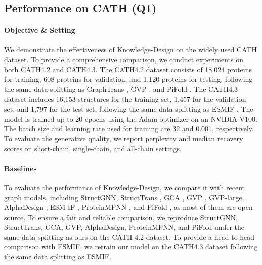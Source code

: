 \documentclass{article}
\begin{document}
\vspace{-3mm}
\subsection{Performance on CATH (Q1)}
\label{sec:exp_cath}
\paragraph{Objective \& Setting} We demonstrate the effectiveness of Knowledge-Design on the widely used CATH \citep{orengo1997cath} dataset. To provide a comprehensive comparison, we conduct experiments on both CATH4.2 and CATH4.3. The CATH4.2 dataset consists of 18,024 proteins for training, 608 proteins for validation, and 1,120 proteins for testing, following the same data splitting as GraphTrans \citep{ingraham2019generative}, GVP \citep{jing2020learning}, and PiFold \citep{gao2023pifold}. The CATH4.3 dataset includes 16,153 structures for the training set, 1,457 for the validation set, and 1,797 for the test set, following the same data splitting as ESMIF \citep{hsu2022learning}. The model is trained up to 20 epochs using the Adam optimizer on an NVIDIA V100. The batch size and learning rate used for training are 32 and 0.001, respectively. To evaluate the generative quality, we report perplexity and median recovery scores on short-chain, single-chain, and all-chain settings.






\paragraph{Baselines} To evaluate the performance of Knowledge-Design, we compare it with recent graph models, including StructGNN, StructTrans \citep{ingraham2019generative}, GCA \citep{tan2022generative}, GVP \citep{jing2020learning}, GVP-large, AlphaDesign \citep{gao2022alphadesign}, ESM-IF \citep{hsu2022learning}, ProteinMPNN \citep{dauparas2022robust}, and PiFold \citep{gao2023pifold}, as most of them are open-source. To ensure a fair and reliable comparison, we reproduce StructGNN, StructTrans, GCA, GVP, AlphaDesign, ProteinMPNN, and PiFold under the same data splitting as ours on the CATH 4.2 dataset. To provide a head-to-head comparison with ESMIF, we retrain our model on the CATH4.3 dataset following the same data splitting as ESMIF. 
\end{document}
